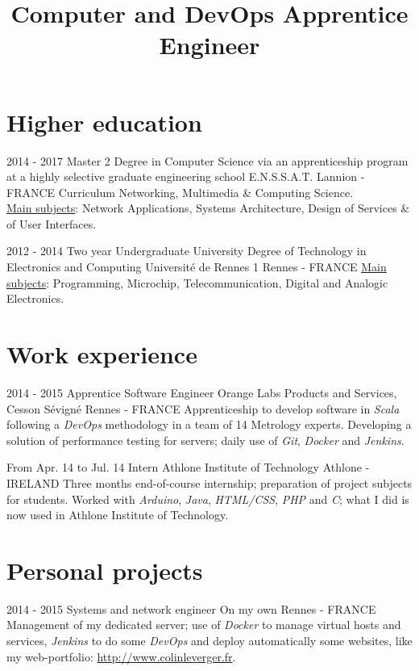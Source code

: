 \documentclass[11pt,a4paper,sans]{moderncv}        %
\title{Computer and DevOps Apprentice Engineer}                               %
\begin{document}
\makecvtitle

\section{Higher education}

\cventry
	{2014 - 2017}
	{Master 2 Degree in Computer Science via an apprenticeship program at a highly selective graduate engineering school}
	{E.N.S.S.A.T.}
	{Lannion - FRANCE}
	{}
	{Curriculum Networking, Multimedia \& Computing Science.\\
    \underline{Main subjects}: Network Applications, Systems Architecture, Design of Services \& of User Interfaces.}  %

\cventry
	{2012 - 2014}
    {Two year Undergraduate University Degree of Technology in Electronics and Computing}
    {Université de Rennes 1}
    {Rennes - FRANCE}
    {}
    {\underline{Main subjects}: Programming, Microchip, Telecommunication, Digital and Analogic Electronics.}
    
\section{Work experience}

\cventry
	{2014 - 2015}
	{Apprentice Software Engineer}
	{Orange Labs Products and Services, Cesson S\'evign\'e}
	{Rennes - FRANCE}
	{}
	{Apprenticeship to develop software in \emph{Scala} following a \emph{DevOps} methodology in a team of 14 Metrology experts. Developing a solution of performance testing for servers; daily use of \emph{Git}, \emph{Docker} and \emph{Jenkins}.}

\cventry
    {From Apr. 14 to Jul. 14}
    {Intern}
    {Athlone Institute of Technology}
    {Athlone - IRELAND}
    {}
    {Three months end-of-course internship; preparation of project subjects for students. Worked with \emph{Arduino}, \emph{Java}, \emph{HTML/CSS}, \emph{PHP} and \emph{C}; what I did is now used in Athlone Institute of Technology.}

\section{Personal projects}
\cventry
	{2014 - 2015}
    {Systems and network engineer}
    {On my own}
    {Rennes - FRANCE}
    {}
    {Management of my dedicated server; use of \emph{Docker} to manage virtual hosts and services, \emph{Jenkins} to do some \emph{DevOps} and deploy automatically some websites, like my web-portfolio: \href{http://www.colinleverger.fr}{http://www.colinleverger.fr}.}
    
\end{document}

